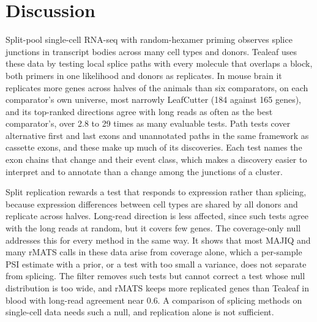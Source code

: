 \documentclass[11pt]{article}
\begin{document}
\section{Discussion}

Split-pool single-cell RNA-seq with random-hexamer priming observes splice junctions in transcript bodies across many cell types and donors. Tealeaf uses these data by testing local splice paths with every molecule that overlaps a block, both primers in one likelihood and donors as replicates. In mouse brain it replicates more genes across halves of the animals than six comparators, on each comparator's own universe, most narrowly LeafCutter (184 against 165 genes), and its top-ranked directions agree with long reads as often as the best comparator's, over 2.8 to 29 times as many evaluable tests. Path tests cover alternative first and last exons and unannotated paths in the same framework as cassette exons, and these make up much of its discoveries. Each test names the exon chains that change and their event class, which makes a discovery easier to interpret and to annotate than a change among the junctions of a cluster.

Split replication rewards a test that responds to expression rather than splicing, because expression differences between cell types are shared by all donors and replicate across halves. Long-read direction is less affected, since such tests agree with the long reads at random, but it covers few genes. The coverage-only null addresses this for every method in the same way. It shows that most MAJIQ and many rMATS calls in these data arise from coverage alone, which a per-sample PSI estimate with a prior, or a test with too small a variance, does not separate from splicing. The filter removes such tests but cannot correct a test whose null distribution is too wide, and rMATS keeps more replicated genes than Tealeaf in blood with long-read agreement near 0.6. A comparison of splicing methods on single-cell data needs such a null, and replication alone is not sufficient.
\end{document}
